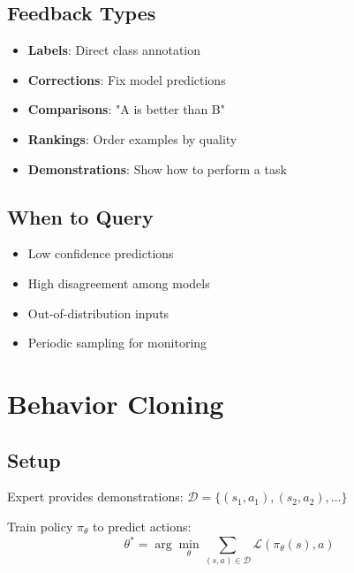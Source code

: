 
\subsection{Feedback Types}

\begin{itemize}
    \item \textbf{Labels}: Direct class annotation
    \item \textbf{Corrections}: Fix model predictions
    \item \textbf{Comparisons}: "A is better than B"
    \item \textbf{Rankings}: Order examples by quality
    \item \textbf{Demonstrations}: Show how to perform a task
\end{itemize}

\subsection{When to Query}

\begin{itemize}
    \item Low confidence predictions
    \item High disagreement among models
    \item Out-of-distribution inputs
    \item Periodic sampling for monitoring
\end{itemize}


\section{Behavior Cloning}


\subsection{Setup}

Expert provides demonstrations: $\mathcal{D} = \{(s_1, a_1), (s_2, a_2), \ldots\}$

Train policy $\pi_\theta$ to predict actions:
\begin{equation}
    \theta^* = \arg\min_\theta \sum_{(s,a) \in \mathcal{D}} \mathcal{L}(\pi_\theta(s), a)
\end{equation}

